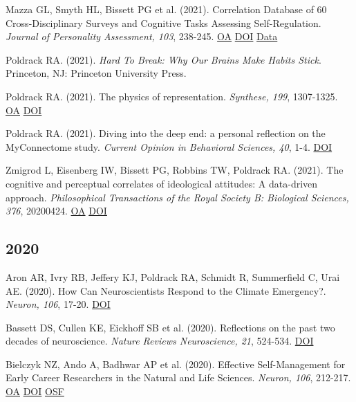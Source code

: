 \documentclass[10pt, letterpaper]{article}
\begin{document}
Mazza GL, Smyth HL, Bissett PG et al. (2021). Correlation Database of 60 Cross-Disciplinary Surveys and Cognitive Tasks Assessing Self-Regulation. \textit{Journal of Personality Assessment, 103}, 238-245. \href{https://www.ncbi.nlm.nih.gov/pmc/articles/PMC7483539}{OA} \href{https://doi.org/10.1080/00223891.2020.1732994}{DOI} \href{https://github.com/IanEisenberg/Self_Regulation_Ontology/tree/master/Data}{Data} \vspace{2mm}

Poldrack RA.  (2021).  \textit{Hard To Break: Why Our Brains Make Habits Stick}. Princeton, NJ: Princeton University Press.\vspace{2mm}

Poldrack RA.  (2021). The physics of representation. \textit{Synthese, 199}, 1307-1325. \href{https://doi.org/10.1007/s11229-020-02793-y}{OA} \href{https://doi.org/10.1007/s11229-020-02793-y}{DOI} \vspace{2mm}

Poldrack RA.  (2021). Diving into the deep end: a personal reflection on the MyConnectome study. \textit{Current Opinion in Behavioral Sciences, 40}, 1-4. \href{https://doi.org/10.1016/j.cobeha.2020.10.008}{DOI} \vspace{2mm}

Zmigrod L, Eisenberg IW, Bissett PG, Robbins TW, Poldrack RA.  (2021). The cognitive and perceptual correlates of ideological attitudes: A data-driven approach. \textit{Philosophical Transactions of the Royal Society B: Biological Sciences, 376}, 20200424. \href{https://www.ncbi.nlm.nih.gov/pmc/articles/PMC7935109}{OA} \href{https://doi.org/10.1098/rstb.2020.0424}{DOI} \vspace{2mm}

\subsection*{2020}Aron AR, Ivry RB, Jeffery KJ, Poldrack RA, Schmidt R, Summerfield C, Urai AE.  (2020). How Can Neuroscientists Respond to the Climate Emergency?. \textit{Neuron, 106}, 17-20. \href{https://doi.org/10.1016/j.neuron.2020.02.019}{DOI} \vspace{2mm}

Bassett DS, Cullen KE, Eickhoff SB et al. (2020). Reflections on the past two decades of neuroscience. \textit{Nature Reviews Neuroscience, 21}, 524-534. \href{https://doi.org/10.1038/s41583-020-0363-6}{DOI} \vspace{2mm}

Bielczyk NZ, Ando A, Badhwar AP et al. (2020). Effective Self-Management for Early Career Researchers in the Natural and Life Sciences. \textit{Neuron, 106}, 212-217. \href{https://www.ncbi.nlm.nih.gov/pmc/articles/PMC7665085}{OA} \href{https://doi.org/10.1016/j.neuron.2020.03.015}{DOI} \href{https://osf.io/w6emk/}{OSF} \vspace{2mm}
\end{document}

